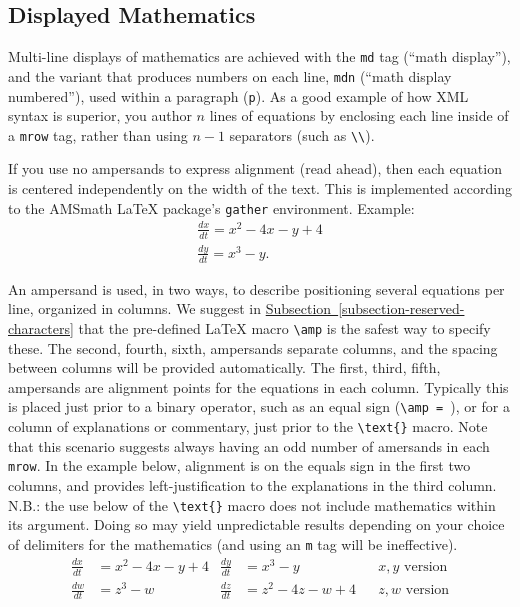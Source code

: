 \documentclass[10pt,]{article}
\theoremstyle{plain}
\theoremstyle{definition}
\theoremstyle{definition}
\theoremstyle{definition}
\theoremstyle{definition}
\theoremstyle{definition}
\theoremstyle{definition}
\numberwithin{equation}{section}
\newcommand{\amp}{&}
\begin{document}
\subsection[{Displayed Mathematics}]{Displayed Mathematics}\label{subsection-9}
\hypertarget{p-180}{}%
Multi-line displays of mathematics are achieved with the \lstinline?md? tag (``math display''), and the variant that produces numbers on each line, \lstinline?mdn? (``math display numbered''), used within a paragraph (\lstinline?p?).  As a good example of how XML syntax is superior, you author \(n\) lines of equations by enclosing each line inside of a \lstinline?mrow? tag, rather than using \(n-1\) separators (such as \lstinline?\\?).%
\par
\hypertarget{p-181}{}%
If you use no ampersands to express alignment (read ahead), then each equation is centered independently on the width of the text.  This is implemented according to the AMSmath \LaTeX{} package's \lstinline?gather? environment.  Example:%
\begin{gather*}
\frac{dx}{dt} = x^2 - 4x - y + 4\\
\frac{dy}{dt} = x^3 - y.
\end{gather*}
%
\par
\hypertarget{p-182}{}%
An ampersand is used, in two ways, to describe positioning several equations per line, organized in columns.  We suggest in \hyperref[subsection-reserved-characters]{Subsection~\ref{subsection-reserved-characters}} that the pre-defined \LaTeX{} macro \lstinline?\amp? is the safest way to specify these.  The second, fourth, sixth, \textellipsis{} ampersands separate columns, and the spacing between columns will be provided automatically.  The first, third, fifth, \textellipsis{} ampersands are alignment points for the equations in each column.  Typically this is placed just prior to a binary operator, such as an equal sign (\lstinline?\amp = ?), or for a column of explanations or commentary, just prior to the \lstinline?\text{}? macro.  Note that this scenario suggests always having an odd number of amersands in each \lstinline?mrow?.  In the example below, alignment is on the equals sign in the first two columns, and provides left-justification to the explanations in the third column.  N.B.: the use below of the \lstinline?\text{}? macro does not include mathematics within its argument.  Doing so may yield unpredictable results depending on your choice of delimiters for the mathematics (and using an \lstinline?m? tag will be ineffective).%
\begin{align*}
\frac{dx}{dt} \amp = x^2 - 4x - y + 4 \amp \frac{dy}{dt} \amp = x^3 - y          \amp\amp x, y\text{ version}\\
\frac{dw}{dt} \amp = z^3 - w          \amp \frac{dz}{dt} \amp = z^2 - 4z - w + 4 \amp\amp z, w\text{ version}
\end{align*}
\end{document}
